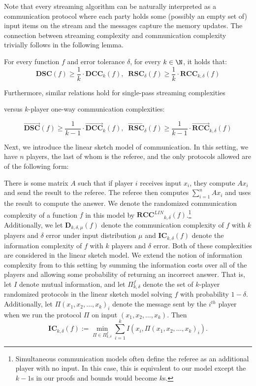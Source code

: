 \documentclass{toc}
\newcommand{\error}{\ensuremath{\delta}}
\newcommand{\eqdef}{\ensuremath{:=}}
\newcommand{\dcc}{\ensuremath{\mathbf{DCC}}}
\newcommand{\rcc}{\ensuremath{\mathbf{RCC}}}
\newcommand{\dsc}{\ensuremath{\mathbf{DSC}}}
\newcommand{\rsc}{\ensuremath{\mathbf{RSC}}}
\newcommand{\ic}{\ensuremath{\mathbf{IC}}}
\newcommand{\dccone}{\ensuremath{\overrightarrow{\mathbf{DCC}}}}
\newcommand{\rccone}{\ensuremath{\overrightarrow{\mathbf{RCC}}}}
\newcommand{\dscone}{\ensuremath{\overrightarrow{\mathbf{DSC}}}}
\newcommand{\rscone}{\ensuremath{\overrightarrow{\mathbf{RSC}}}}
\newcommand{\rcclin}{\ensuremath{\mathbf{RCC}^{LIN}}}
\newcommand{\D}{\ensuremath{\mathbf{D}}}
\begin{document}
Note that every streaming algorithm can be naturally interpreted as a communication protocol where each party holds some (possibly an empty set of) input items on the stream and the messages capture the memory updates.
The connection between streaming complexity and communication complexity trivially follows 
in the following lemma.

\begin{lemma}\label{lemma:sc-cc}
For every function $f$ and error tolerance $\error$, 
for every $k\in\N$, it holds that: 
\[\dsc(f)\ge \frac{1}{k} \cdot \dcc_{k}(f),\;\;
\rsc_{\error}(f)\ge \frac{1}{k} \cdot \rcc_{k,\error}(f)\]

Furthermore, similar relations hold for 
 single-pass streaming complexities 

versus
 $k$-player one-way communication complexities: 

\[\dscone(f)\ge \frac{1}{k-1} \cdot \dccone_{k}(f),\;\;
\rscone_{\error}(f)\ge \frac{1}{k-1} \cdot \rccone_{k,\error}(f)\]

\end{lemma}

Next, we introduce the linear sketch model of communication. In this setting, we have $n$ players, {\color{black}the last of whom is the referee,} and the only protocols allowed are of the following form:

There is some matrix $A$ such that if player $i$ receives input $x_i$, they compute $Ax_i$ and send the result to the referee. The referee then computes $\sum_{i=1}^n Ax_i$ and uses the result to compute the answer. We denote the randomized communication complexity of a function $f$ in this model by $\rcclin_{k,\delta}(f)$.\footnote{Simultaneous communication models often define the referee as an additional player with no input. In this case, this is equivalent to our model except the $k-1$s in our proofs and bounds would become $k$s.}\\

Additionally, we let $\D_{k,\delta,\mu}(f)$ denote the communication complexity of $f$ with $k$ players and $\delta$ error under input distribution $\mu$ and $\ic_{k,\delta}(f)$ denote the information complexity of $f$ with $k$ players and $\delta$ error. {\color{black}Both of these complexities are considered in the linear sketch model.} We extend the notion of information complexity from \cite{959901} to this setting by summing the information costs over all of the players and allowing some probability of returning an incorrect answer. {\color{black}That is, let $I$ denote mutual information, and let $\Pi^{f}_{k,\delta}$ denote the set of $k$-player randomized protocols in the linear sketch model solving $f$ with probability $1-\delta$. Additionally, let $\Pi(x_1, x_2, \dots, x_k)_i$ denote the message sent by the $i^{th}$ player when we run the protocol $\Pi$ on input $(x_1, x_2, \dots, x_k)$. Then
$$\ic_{k,\delta}(f) \eqdef \min_{\Pi \in \Pi^f_{k,\delta}} \sum_{i=1}^k I\left(x_i, \Pi(x_1, x_2, \dots, x_k)_i\right).$$}
\end{document}
